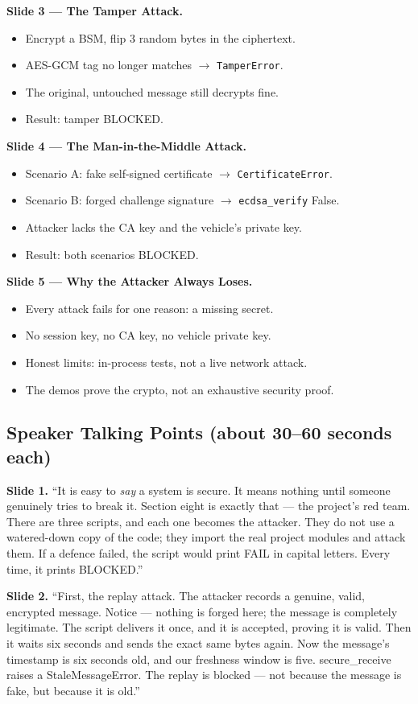 \documentclass[11pt,a4paper]{report}
\begin{document}
\textbf{Slide 3 --- The Tamper Attack.}
\begin{itemize}
  \item Encrypt a BSM, flip 3 random bytes in the ciphertext.
  \item AES-GCM tag no longer matches $\to$ \texttt{TamperError}.
  \item The original, untouched message still decrypts fine.
  \item Result: tamper BLOCKED.
\end{itemize}

\textbf{Slide 4 --- The Man-in-the-Middle Attack.}
\begin{itemize}
  \item Scenario A: fake self-signed certificate $\to$ \texttt{CertificateError}.
  \item Scenario B: forged challenge signature $\to$ \texttt{ecdsa\_verify} False.
  \item Attacker lacks the CA key and the vehicle's private key.
  \item Result: both scenarios BLOCKED.
\end{itemize}

\textbf{Slide 5 --- Why the Attacker Always Loses.}
\begin{itemize}
  \item Every attack fails for one reason: a missing secret.
  \item No session key, no CA key, no vehicle private key.
  \item Honest limits: in-process tests, not a live network attack.
  \item The demos prove the crypto, not an exhaustive security proof.
\end{itemize}

\subsection{Speaker Talking Points (about 30--60 seconds each)}

\textbf{Slide 1.} ``It is easy to \emph{say} a system is secure. It means nothing
until someone genuinely tries to break it. Section eight is exactly that --- the
project's red team. There are three scripts, and each one becomes the attacker.
They do not use a watered-down copy of the code; they import the real project
modules and attack them. If a defence failed, the script would print FAIL in
capital letters. Every time, it prints BLOCKED.''

\textbf{Slide 2.} ``First, the replay attack. The attacker records a genuine,
valid, encrypted message. Notice --- nothing is forged here; the message is
completely legitimate. The script delivers it once, and it is accepted, proving
it is valid. Then it waits six seconds and sends the exact same bytes again. Now
the message's timestamp is six seconds old, and our freshness window is five.
secure\_receive raises a StaleMessageError. The replay is blocked --- not because
the message is fake, but because it is old.''
\end{document}
